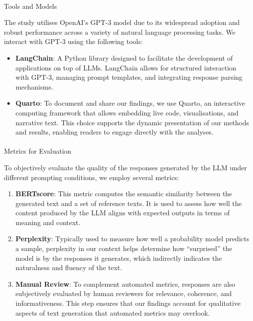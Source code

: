 \documentclass[
]{agujournal2019}
\makeatletter
\let\oldparagraph\paragraph
\renewcommand{\paragraph}{
    \@ifstar
      \xxxParagraphStar
      \xxxParagraphNoStar
  }
\newcommand{\xxxParagraphStar}[1]{\oldparagraph*{#1}\mbox{}}
\newcommand{\xxxParagraphNoStar}[1]{\oldparagraph{#1}\mbox{}}
\makeatother
\begin{document}
\paragraph{Tools and Models}\label{tools-and-models}

The study utilises OpenAI's GPT-3 model due to its widespread adoption
and robust performance across a variety of natural language processing
tasks. We interact with GPT-3 using the following tools:

\begin{itemize}
\item
  \textbf{LangChain}: A Python library designed to facilitate the
  development of applications on top of LLMs. LangChain allows for
  structured interaction with GPT-3, managing prompt templates, and
  integrating response parsing mechanisms.
\item
  \textbf{Quarto}: To document and share our findings, we use Quarto, an
  interactive computing framework that allows embedding live code,
  visualisations, and narrative text. This choice supports the dynamic
  presentation of our methods and results, enabling readers to engage
  directly with the analyses.
\end{itemize}

\paragraph{Metrics for Evaluation}\label{metrics-for-evaluation}

To objectively evaluate the quality of the responses generated by the
LLM under different prompting conditions, we employ several metrics:

\begin{enumerate}
\def\labelenumi{\arabic{enumi}.}
\item
  \textbf{BERTscore}: This metric computes the semantic similarity
  between the generated text and a set of reference texts. It is used to
  assess how well the content produced by the LLM aligns with expected
  outputs in terms of meaning and context.
\item
  \textbf{Perplexity}: Typically used to measure how well a probability
  model predicts a sample, perplexity in our context helps determine how
  ``surprised'' the model is by the responses it generates, which
  indirectly indicates the naturalness and fluency of the text.
\item
  \textbf{Manual Review}: To complement automated metrics, responses are
  also subjectively evaluated by human reviewers for relevance,
  coherence, and informativeness. This step ensures that our findings
  account for qualitative aspects of text generation that automated
  metrics may overlook.
\end{enumerate}
\end{document}
